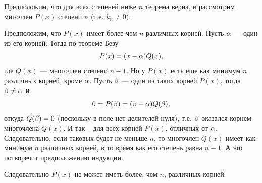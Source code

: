 \begin{enumerate}
Предположим, что для всех степеней ниже $n$ теорема верна, и рассмотрим мнгочлен $P(x)$ степени $n$ (т.е. $k_n\ne 0$).

Предположим, что $P(x)$ имеет более чем $n$ различных корней. Пусть $\alpha$ --- один из его корней. Тогда по теореме Безу
\begin{equation}\label{PQ}
P(x)=(x-\alpha)Q(x),
\end{equation}
где $Q(x)$ --- многочлен степени $n-1$. Но у $P(x)$ есть еще как минимум $n$ различных корней, кроме $\alpha$. Пусть $\beta$ --- один из таких корней $P(x)$, тогда $\beta\ne\alpha$ и
$$
0=P(\beta)=(\beta-\alpha)Q(\beta),
$$
откуда $Q(\beta)=0$ (поскольку в поле нет делителей нуля),
т.е. $\beta$ оказался корнем многочлена $Q(x)$. И так -- для всех корней $P(x)$, отличных от $\alpha$. Следовательно, если таковых будет не меньше $n$, то многочлен $Q(x)$ имеет как минимум $n$ различных корней, в то время как его степень равна $n-1$. А это потворечит предположению индукции.

Следовательно $P(x)$ не может иметь более, чем $n$, различных корней.
\epf


\end{enumerate}
